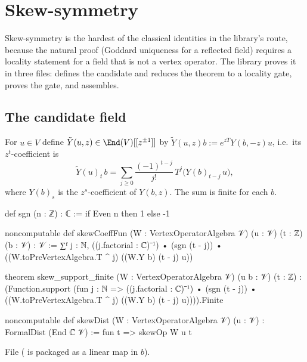 \section{Skew-symmetry}\label{l03:sec:skew}

Skew-symmetry is the hardest of the classical identities in the library's route, because the
natural proof (Goddard uniqueness for a reflected field) requires a locality statement for a field
that is not a vertex operator. The library proves it in three files:  defines
the candidate and reduces the theorem to a locality gate,  proves the gate,
and  assembles.

\subsection{The candidate field}

\begin{definition}\label{l03:def:skewdist}
For $u\in V$ define $\tilde Y(u,z)\in\End(V)[[z^{\pm1}]]$ by $\tilde Y(u,z)b := e^{zT}Y(b,-z)u$, i.e.\
its $z^t$-coefficient is
\begin{equation*}
\tilde Y(u)_t\,b = \sum_{j\ge0}\frac{(-1)^{t-j}}{j!}\,T^j\big(Y(b)_{t-j}\,u\big),
\end{equation*}
where $Y(b)_s$ is the $z^s$-coefficient of $Y(b,z)$. The sum is finite for each $b$.
\end{definition}
\begin{leancode}
def sgn (n : ℤ) : ℂ := if Even n then 1 else -1

noncomputable def skewCoeffFun (W : VertexOperatorAlgebra 𝒱) (u : 𝒱) (t : ℤ) (b : 𝒱) : 𝒱 :=
  ∑ᶠ j : ℕ, ((j.factorial : ℂ)⁻¹) • (sgn (t - j)) •
    ((W.toPreVertexAlgebra.T ^ j) ((W.Y b) (t - j) u))

theorem skew_support_finite (W : VertexOperatorAlgebra 𝒱) (u b : 𝒱) (t : ℤ) :
    (Function.support (fun j : ℕ => ((j.factorial : ℂ)⁻¹) • (sgn (t - j)) •
      ((W.toPreVertexAlgebra.T ^ j) ((W.Y b) (t - j) u)))).Finite

noncomputable def skewDist (W : VertexOperatorAlgebra 𝒱) (u : 𝒱) : FormalDist (End ℂ 𝒱) :=
  fun t => skewOp W u t
\end{leancode}
File  ( is
\lean{skewCoeffFun W u t} packaged as a linear map in $b$).

